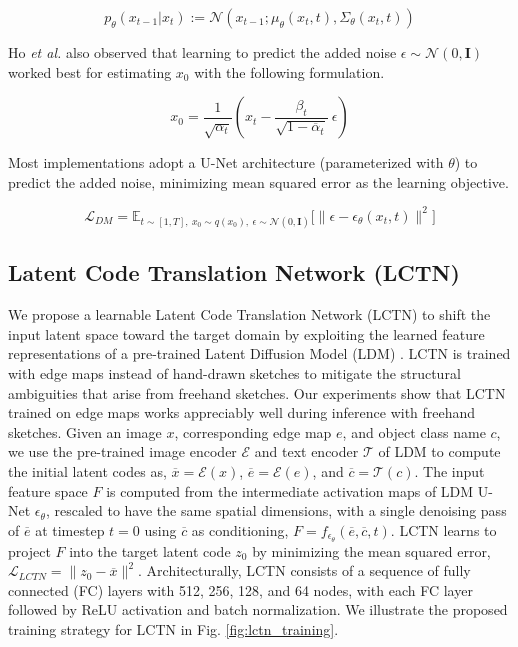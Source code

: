 \begin{equation}\label{eq:eq4}
  p_\theta(x_{t-1} | x_t) := \mathcal{N}(x_{t-1}; \mu_\theta(x_t, t), \Sigma_\theta(x_t, t))
\end{equation}

\noindent
Ho \emph{et al.} \cite{ho2020denoising} also observed that learning to predict the added noise $\epsilon \sim \mathcal{N}(0, \mathbf{I})$ worked best for estimating $x_0$ with the following formulation.

\begin{equation}\label{eq:eq5}
  x_0 = \frac{1}{\sqrt{\alpha_t}} \left( x_t - \frac{\beta_t}{\sqrt{1 - \overline{\alpha}_t}} ~\epsilon \right)
\end{equation}

\noindent
Most implementations adopt a U-Net architecture (parameterized with $\theta$) to predict the added noise, minimizing mean squared error as the learning objective.

\begin{equation}\label{eq:eq6}
  \mathcal{L}_{DM} = \mathbb{E}_{t \sim [1, T], ~x_0 \sim q(x_0), ~\epsilon \sim \mathcal{N}(0, \mathbf{I})} \bigg[ \| \epsilon - \epsilon_\theta(x_t, t) \|^2 \bigg]
\end{equation}

\subsection{Latent Code Translation Network (LCTN)}\label{sec:method_lctn}
We propose a learnable Latent Code Translation Network (LCTN) to shift the input latent space toward the target domain by exploiting the learned feature representations of a pre-trained Latent Diffusion Model (LDM) \cite{rombach2022high}. LCTN is trained with edge maps \cite{su2021pixel} instead of hand-drawn sketches to mitigate the structural ambiguities that arise from freehand sketches. Our experiments show that LCTN trained on edge maps works appreciably well during inference with freehand sketches. Given an image $x$, corresponding edge map $e$, and object class name $c$, we use the pre-trained image encoder $\mathcal{E}$ and text encoder $\mathcal{T}$ of LDM to compute the initial latent codes as, $\overline{x} = \mathcal{E}(x)$, $\overline{e} = \mathcal{E}(e)$, and $\overline{c} = \mathcal{T}(c)$. The input feature space $F$ is computed from the intermediate activation maps of LDM U-Net $\epsilon_\theta$, rescaled to have the same spatial dimensions, with a single denoising pass of $\overline{e}$ at timestep $t = 0$ using $\overline{c}$ as conditioning, $F = f_{\epsilon_\theta}(\overline{e}, \overline{c}, t)$. LCTN learns to project $F$ into the target latent code $z_0$ by minimizing the mean squared error, $\mathcal{L}_{LCTN} = \|z_0 - \overline{x}\|^2$. Architecturally, LCTN consists of a sequence of fully connected (FC) layers with 512, 256, 128, and 64 nodes, with each FC layer followed by ReLU activation and batch normalization. We illustrate the proposed training strategy for LCTN in Fig. \ref{fig:lctn_training}.

